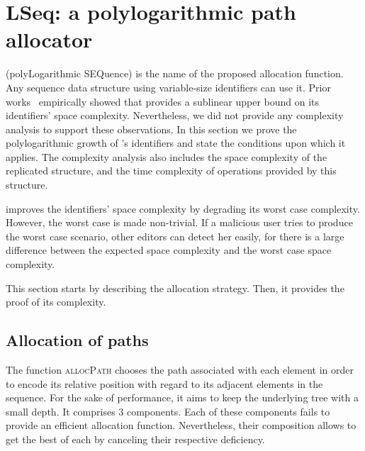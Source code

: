 

\section{LSeq: a polylogarithmic path allocator}
\label{sec:proposal}

\LSEQ (polyLogarithmic SEQuence) is the name of the proposed allocation
function. Any sequence data structure using variable-size identifiers can use
it. Prior works~\cite{nedelec2013concurrency, nedelec2013lseq} empirically
showed that \LSEQ provides a sublinear upper bound on its identifiers' space
complexity. Nevertheless, we did not provide any complexity analysis to support
these observations. In this section we prove the polylogarithmic growth of
\LSEQ's identifiers and state the conditions upon which it applies. The
complexity analysis also includes the space complexity of the replicated
structure, and the time complexity of operations provided by this structure. 

\LSEQ improves the identifiers' space complexity by degrading its worst case
complexity. However, the worst case is made non-trivial. If a malicious user
tries to produce the worst case scenario, other editors can detect her easily,
for there is a large difference between the expected space complexity and the
worst case space complexity.

This section starts by describing the allocation strategy. Then, it
provides the proof of its complexity.

\subsection{Allocation of paths}
\label{subsec:lseqallocation}

The function \textsc{allocPath} chooses the path associated with each element in
order to encode its relative position with regard to its adjacent elements in
the sequence. For the sake of performance, it aims to keep the underlying tree
with a small depth. It comprises 3 components. Each of these components fails to
provide an efficient allocation function. Nevertheless, their composition allows
to get the best of each by canceling their respective deficiency.

